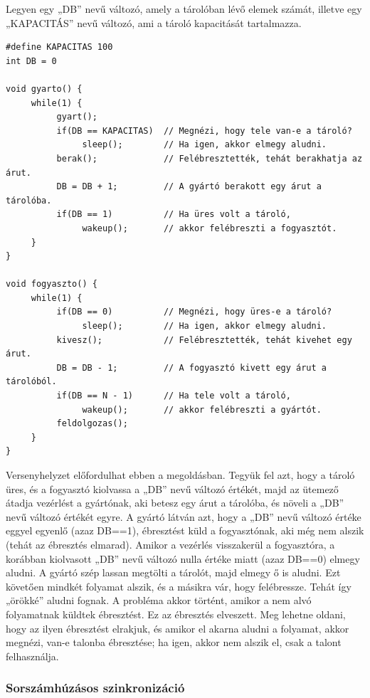 \documentclass[tikz,12pt,margin=0px]{article}
\begin{document}
    \noindent Legyen egy „DB” nevű változó, amely a tárolóban lévő elemek számát, illetve egy „KAPACITÁS” nevű változó, ami a tároló kapacitását tartalmazza.
\newpage
\begin{verbatim}
#define KAPACITAS 100
int DB = 0

void gyarto() {
     while(1) {
          gyart();
          if(DB == KAPACITAS)  // Megnézi, hogy tele van-e a tároló?
               sleep();        // Ha igen, akkor elmegy aludni.
          berak();             // Felébresztették, tehát berakhatja az árut.
          DB = DB + 1;         // A gyártó berakott egy árut a tárolóba.
          if(DB == 1)          // Ha üres volt a tároló,
               wakeup();       // akkor felébreszti a fogyasztót.
     }
}

void fogyaszto() {
     while(1) {
          if(DB == 0)          // Megnézi, hogy üres-e a tároló?
               sleep();        // Ha igen, akkor elmegy aludni.
          kivesz();            // Felébresztették, tehát kivehet egy árut.
          DB = DB - 1;         // A fogyasztó kivett egy árut a tárolóból.
          if(DB == N - 1)      // Ha tele volt a tároló,
               wakeup();       // akkor felébreszti a gyártót.
          feldolgozas();
     }
}
\end{verbatim}

    \noindent Versenyhelyzet előfordulhat ebben a megoldásban. Tegyük fel azt, hogy a tároló üres, és a fogyasztó kiolvassa a „DB” nevű változó értékét, majd az ütemező átadja vezérlést a gyártónak, aki betesz egy árut a tárolóba, és növeli a „DB” nevű változó értékét egyre. A gyártó látván azt, hogy a „DB” nevű változó értéke eggyel egyenlő (azaz DB==1), ébresztést küld a fogyasztónak, aki még nem alszik (tehát az ébresztés elmarad). Amikor a vezérlés visszakerül a fogyasztóra, a korábban kiolvasott „DB” nevű változó nulla értéke miatt (azaz DB==0) elmegy aludni. A gyártó szép lassan megtölti a tárolót, majd elmegy ő is aludni. Ezt követően mindkét folyamat alszik, és a másikra vár, hogy felébressze. Tehát így „örökké” aludni fognak. A probléma akkor történt, amikor a nem alvó folyamatnak küldtek ébresztést. Ez az ébresztés elveszett. Meg lehetne oldani, hogy az ilyen ébresztést elrakjuk, és amikor el akarna aludni a folyamat, akkor megnézi, van-e talonba ébresztése; ha igen, akkor nem alszik el, csak a talont felhasználja.
\newpage
    \subsubsection*{Sorszámhúzásos szinkronizáció}
\end{document}
